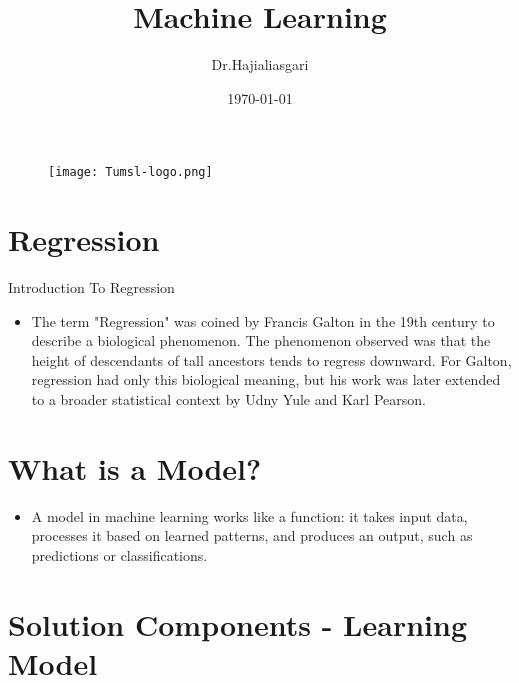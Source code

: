 \documentclass[serif, aspectratio=169]{beamer}
\author{Dr.Hajialiasgari}
\title{Machine Learning}
\institute{
    Tehran University \\
    Of\\
    Medical Science
}
\date{\small \today}
\begin{document}
\begin{frame}
    \titlepage
    \vspace*{-0.6cm}
    \begin{figure}[htpb]
        \begin{center}
            \texttt{[image: Tumsl-logo.png]}
        \end{center}
    \end{figure}
\end{frame}

\begin{frame}    
\tableofcontents[sectionstyle=show, subsectionstyle=show/shaded/hide, subsubsectionstyle=show/shaded/hide]
\end{frame}

\section{Regression}
\begin{frame}{Introduction To Regression}
     \begin{itemize}
         \item The term "Regression" was coined by Francis Galton in the 19th century to describe a biological phenomenon. The phenomenon observed was that the height of descendants of tall ancestors tends to regress downward. For Galton, regression had only this biological meaning, but his work was later extended to a broader statistical context by Udny Yule and Karl Pearson.
     \end{itemize}
    
\end{frame}


\section{What is a Model?}
\begin{frame}
    \begin{itemize}
        \item A model in machine learning works like a function: it takes input data, processes it based on learned patterns, and produces an output, such as predictions or classifications.
    \end{itemize}
\end{frame}


\section{Solution Components - Learning Model}
\end{document}
